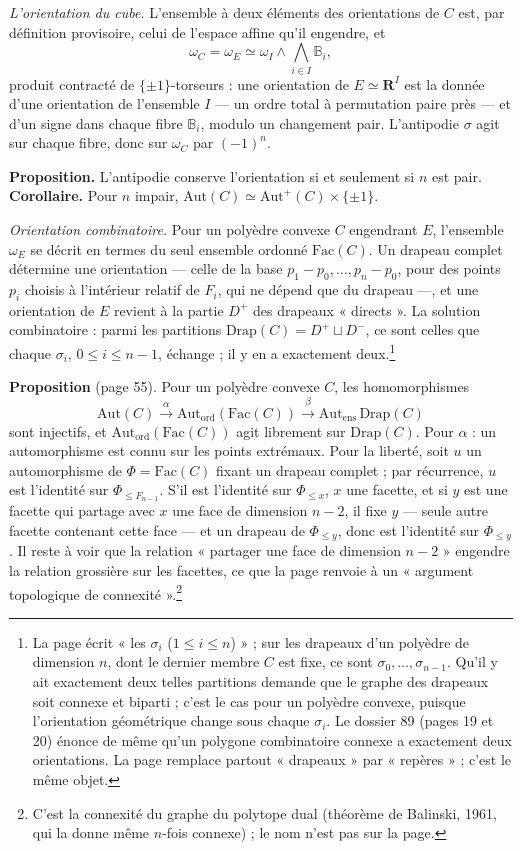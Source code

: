 \documentclass[11pt,a4paper]{article}
\begin{document}
\emph{L'orientation du cube.} L'ensemble à deux éléments des orientations de
$C$ est, par définition provisoire, celui de l'espace affine qu'il engendre,
et
\[
  \omega_C = \omega_E \simeq \omega_I \wedge \bigwedge_{i \in I}
  \mathbb{B}_i ,
\]
produit contracté de $\{\pm 1\}$-torseurs : une orientation de $E \simeq
\mathbf{R}^I$ est la donnée d'une orientation de l'ensemble $I$ --- un ordre
total à permutation paire près --- et d'un signe dans chaque fibre
$\mathbb{B}_i$, modulo un changement pair. L'antipodie $\sigma$ agit sur
chaque fibre, donc sur $\omega_C$ par $(-1)^n$.

\textbf{Proposition.} L'antipodie conserve l'orientation si et seulement si
$n$ est pair. \textbf{Corollaire.} Pour $n$ impair, $\mathrm{Aut}(C) \simeq
\mathrm{Aut}^+(C) \times \{\pm 1\}$.

\emph{Orientation combinatoire.} Pour un polyèdre convexe $C$ engendrant $E$,
l'ensemble $\omega_E$ se décrit en termes du seul ensemble ordonné
$\mathrm{Fac}(C)$. Un drapeau complet détermine une orientation --- celle de
la base $p_1 - p_0, \ldots, p_n - p_0$, pour des points $p_i$ choisis à
l'intérieur relatif de $F_i$, qui ne dépend que du drapeau ---, et une
orientation de $E$ revient à la partie $D^+$ des drapeaux « directs ». La
solution combinatoire : parmi les partitions $\mathrm{Drap}(C) = D^+ \sqcup
D^-$, ce sont celles que chaque $\sigma_i$, $0 \leqslant i \leqslant n-1$,
échange ; il y en a exactement deux.\footnote{La page écrit « les $\sigma_i$
($1 \leqslant i \leqslant n$) » ; sur les drapeaux d'un polyèdre de
dimension $n$, dont le dernier membre $C$ est fixe, ce sont $\sigma_0, \ldots,
\sigma_{n-1}$. Qu'il y ait exactement deux telles partitions demande que le
graphe des drapeaux soit connexe et biparti ; c'est le cas pour un polyèdre
convexe, puisque l'orientation géométrique change sous chaque $\sigma_i$.
Le dossier 89 (pages 19 et 20) énonce de même qu'un polygone combinatoire
connexe a exactement deux orientations. La page remplace partout
« drapeaux » par « repères » ; c'est le même objet.}

\textbf{Proposition} (page 55). Pour un polyèdre convexe $C$, les
homomorphismes
\[
  \mathrm{Aut}(C) \xrightarrow{\ \alpha\ } \mathrm{Aut}_{\mathrm{ord}}
  (\mathrm{Fac}(C)) \xrightarrow{\ \beta\ } \mathrm{Aut}_{\mathrm{ens}}\,
  \mathrm{Drap}(C)
\]
sont injectifs, et $\mathrm{Aut}_{\mathrm{ord}}(\mathrm{Fac}(C))$ agit
librement sur $\mathrm{Drap}(C)$. Pour $\alpha$ : un automorphisme est connu
sur les points extrémaux. Pour la liberté, soit $u$ un automorphisme de
$\Phi = \mathrm{Fac}(C)$ fixant un drapeau complet ; par récurrence, $u$ est
l'identité sur $\Phi_{\leqslant F_{n-1}}$. S'il est l'identité sur
$\Phi_{\leqslant x}$, $x$ une facette, et si $y$ est une facette qui partage
avec $x$ une face de dimension $n - 2$, il fixe $y$ --- seule autre facette
contenant cette face --- et un drapeau de $\Phi_{\leqslant y}$, donc est
l'identité sur $\Phi_{\leqslant y}$. Il reste à voir que la relation
« partager une face de dimension $n-2$ » engendre la relation grossière sur
les facettes, ce que la page renvoie à un « argument topologique de
connexité ».\footnote{C'est la connexité du graphe du polytope dual
(théorème de Balinski, 1961, qui la donne même $n$-fois connexe) ; le nom
n'est pas sur la page.}
\end{document}
